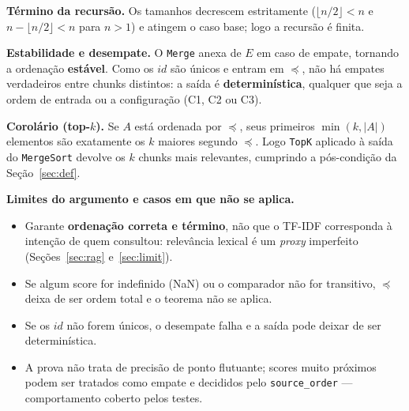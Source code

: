\documentclass[11pt,a4paper]{article}
\begin{document}
\textbf{Término da recursão.} Os tamanhos decrescem estritamente ($\lfloor n/2\rfloor<n$ e
$n-\lfloor n/2\rfloor<n$ para $n>1$) e atingem o caso base; logo a recursão é finita.

\textbf{Estabilidade e desempate.} O \texttt{Merge} anexa de $E$ em caso de empate, tornando a
ordenação \textbf{estável}. Como os $id$ são únicos e entram em $\preceq$, não há empates verdadeiros
entre chunks distintos: a saída é \textbf{determinística}, qualquer que seja a ordem de entrada ou a
configuração (C1, C2 ou C3).

\begin{teo}
\textbf{\color{verde}Corolário (top-$k$).} Se $A$ está ordenada por $\preceq$, seus primeiros
$\min(k,|A|)$ elementos são exatamente os $k$ maiores segundo $\preceq$. Logo \texttt{TopK} aplicado
à saída do \texttt{MergeSort} devolve os $k$ chunks mais relevantes, cumprindo a pós-condição da
Seção~\ref{sec:def}.
\end{teo}

\textbf{Limites do argumento e casos em que não se aplica.}
\begin{itemize}[leftmargin=1.4em,itemsep=1pt]
\item Garante \textbf{ordenação correta e término}, não que o TF-IDF corresponda à intenção de quem
consultou: relevância lexical é um \emph{proxy} imperfeito (Seções~\ref{sec:rag} e~\ref{sec:limit}).
\item Se algum score for indefinido (NaN) ou o comparador não for transitivo, $\preceq$ deixa de ser
ordem total e o teorema não se aplica.
\item Se os $id$ não forem únicos, o desempate falha e a saída pode deixar de ser determinística.
\item A prova não trata de precisão de ponto flutuante; scores muito próximos podem ser tratados como
empate e decididos pelo \texttt{source\_order} --- comportamento coberto pelos testes.
\end{itemize}
\end{document}

